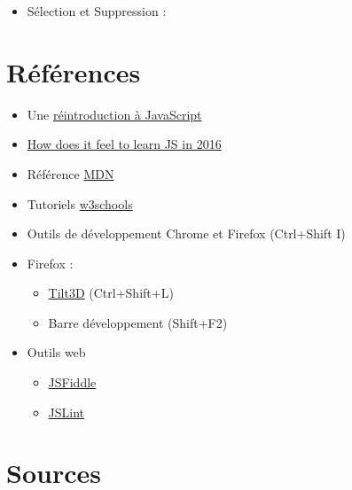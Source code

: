 \begin{itemize}
\tightlist
\item
  Sélection et Suppression :
\end{itemize}

\begin{otherlanguage}{english}

\begin{Shaded}
\begin{Highlighting}[]
    \OperatorTok{=} \AttributeTok{$}\NormalTok{(}\NormalTok{)}\OperatorTok{;} 
    \NormalTok{()}\OperatorTok{;}
\end{Highlighting}
\end{Shaded}

\end{otherlanguage}

\hypertarget{ruxe9fuxe9rences}{%
\section{Références}\label{ruxe9fuxe9rences}}

\begin{itemize}
\tightlist
\item
  Une
  \href{https://developer.mozilla.org/fr/docs/Web/JavaScript/Une_r\%C3\%A9introduction_\%C3\%A0_JavaScript}{réintroduction
  à JavaScript}
\item
  \href{https://hackernoon.com/how-it-feels-to-learn-javascript-in-2016-d3a717dd577f}{How
  does it feel to learn JS in 2016}
\item
  Référence
  \href{https://developer.mozilla.org/fr/docs/Web/JavaScript/Reference}{MDN}
\item
  Tutoriels \href{http://www.w3schools.com/js/}{w3schools}
\item
  Outils de développement Chrome et Firefox (Ctrl+Shift I)
\item
  Firefox :

  \begin{itemize}
  \tightlist
  \item
    \href{https://addons.mozilla.org/fr/firefox/addon/tilt/}{Tilt3D}
    (Ctrl+Shift+L)
  \item
    Barre développement (Shift+F2)
  \end{itemize}
\item
  Outils web

  \begin{itemize}
  \tightlist
  \item
    \href{https://jsfiddle.net/}{JSFiddle}
  \item
    \href{http://www.jslint.com/}{JSLint}
  \end{itemize}
\end{itemize}

\begin{otherlanguage}{english}

\end{otherlanguage}

\begin{otherlanguage}{english}

\end{otherlanguage}

\hypertarget{sources}{%
\section{Sources}\label{sources}}
